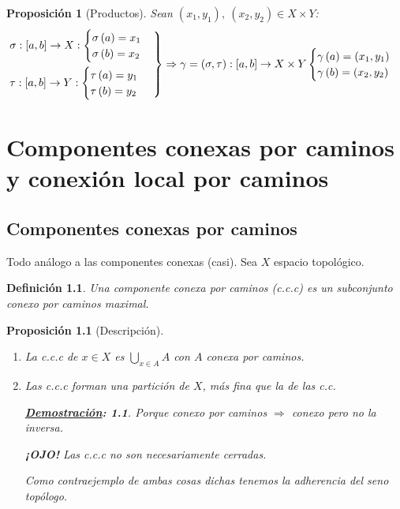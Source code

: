 \documentclass[10pt,a4paper,openright]{book}
\theoremstyle{break}
\newtheorem*{defi}{Definición}
\newtheorem*{prop}{Proposición}
\newtheorem*{demo}{\underline{Demostración}:}
\begin{document}
\begin{prop}[Productos]
Sean $\left( x_1, y_1 \right),\ \left( x_2, y_2 \right) \in X \times Y$: 
\[
\begin{rcases}
    \sigma: \left[ a, b \right] \rightarrow X: \begin{cases}
        \sigma\left( a \right) = x_1\\
        \sigma\left( b \right) = x_2
    \end{cases}\\
    \tau: \left[ a, b \right] \rightarrow Y: \begin{cases}
        \tau\left( a \right) = y_1\\
        \tau\left( b \right) = y_2
    \end{cases}
\end{rcases} 
    \Rightarrow \gamma = \left( \sigma, \tau \right) : \left[ a, b \right] \rightarrow X \times Y \begin{cases}
        \gamma\left( a \right) = \left( x_1, y_1 \right)\\
        \gamma\left( b \right) = \left( x_2, y_2 \right)
    \end{cases}  
\]
\end{prop}


\chapter{Componentes conexas por caminos y conexión local por caminos}%
\label{cha:componentes_conexas_por_caminos_y_conexion_local_por_caminos}
\section{Componentes conexas por caminos}%
\label{sec:componentes_conexas_por_caminos}
Todo análogo a las componentes conexas (casi). Sea $X$ espacio topológico.
\begin{defi}
Una componente conexa por caminos (c.c.c) es un subconjunto conexo por caminos maximal.
\end{defi}
\begin{prop}[Descripción]
\begin{enumerate}
    \item La c.c.c de $x \in X$ es $\bigcup_{x \in A} A$ con $A$ conexa por caminos.
    \item Las c.c.c forman una partición de $X$, más fina que la de las c.c.
    \begin{demo}
        Porque conexo por caminos $\Rightarrow$ conexo pero no la inversa.

        \textbf{¡OJO!} Las c.c.c no son necesariamente cerradas. 

        Como contraejemplo de ambas cosas dichas tenemos la adherencia del seno topólogo. 
    \end{demo}
\end{enumerate} 
\end{prop}
\end{document}
